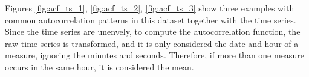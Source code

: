 Figures \ref{fig:acf_ts_1}, \ref{fig:acf_ts_2}, \ref{fig:acf_ts_3} show three examples with common autocorrelation patterns in this dataset together with the time series. Since the time series are unenvely, to compute the autocorrelation function, the raw time series is transformed, and it is only considered the date and hour of a measure, ignoring the minutes and seconds. Therefore, if more than one measure occurs in the same hour, it is considered the mean.

\begin{figure}[H]
\end{figure}
